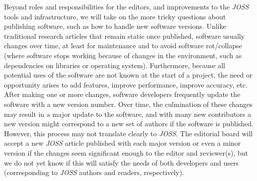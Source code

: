 \documentclass{article}
\newcommand{\add}[1]{{\sloppy\cbcolor{teal}\textcolor{teal}{\cbstart {#1}\cbend}}}  %
\newcommand\joss{\textit{JOSS}}
\begin{document}
Beyond roles and responsibilities for the editors, and improvements to the \joss{} tools and infrastructure, we will take on the more tricky questions about publishing software, such as how to handle new software versions.
Unlike traditional research articles that remain static once published,
software usually changes over time, at least for maintenance and to avoid
software rot\slash collapse (where software stops working because
of changes in the environment, such as dependencies on
libraries or operating system).
Furthermore, because all potential uses of the software are not
known at the start of a project, the need or opportunity arises to add
features, improve performance, improve accuracy, etc.
After making one or more changes, software developers frequently update the software with a new version number.
Over time, the culmination of these changes may result in a major update to the software, and with many new contributors a new version might correspond to a new set of authors if the software is published.
However, this process may not translate clearly to \joss{}.
The editorial board will accept a new \joss{} article published with each major version or even a minor version if the changes seem significant enough to the editor and reviewer(s), but we do not yet know if this will satisfy the needs of both developers and users (corresponding to \joss{} authors and readers, respectively).

\end{document}
